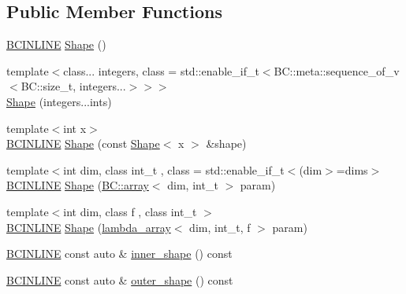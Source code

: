 \subsection*{Public Member Functions}
\begin{DoxyCompactItemize}
\item 
\hyperlink{BlackCat__Common_8h_a6699e8b0449da5c0fafb878e59c1d4b1}{B\+C\+I\+N\+L\+I\+NE} \hyperlink{classBC_1_1tensors_1_1exprs_1_1Shape_a9d196142290733eb76b4d7abb79fb5af}{Shape} ()
\item 
{\footnotesize template$<$class... integers, class  = std\+::enable\+\_\+if\+\_\+t$<$\+B\+C\+::meta\+::sequence\+\_\+of\+\_\+v$<$\+B\+C\+::size\+\_\+t, integers...$>$$>$$>$ }\\\hyperlink{classBC_1_1tensors_1_1exprs_1_1Shape_a9ba3205dd977b91533c22664066ede8d}{Shape} (integers...\+ints)
\item 
{\footnotesize template$<$int x$>$ }\\\hyperlink{BlackCat__Common_8h_a6699e8b0449da5c0fafb878e59c1d4b1}{B\+C\+I\+N\+L\+I\+NE} \hyperlink{classBC_1_1tensors_1_1exprs_1_1Shape_a12fd8a59192e94518fceab9f69308116}{Shape} (const \hyperlink{classBC_1_1tensors_1_1exprs_1_1Shape}{Shape}$<$ x $>$ \&shape)
\item 
{\footnotesize template$<$int dim, class int\+\_\+t , class  = std\+::enable\+\_\+if\+\_\+t$<$(dim$>$=dims$>$ }\\\hyperlink{BlackCat__Common_8h_a6699e8b0449da5c0fafb878e59c1d4b1}{B\+C\+I\+N\+L\+I\+NE} \hyperlink{classBC_1_1tensors_1_1exprs_1_1Shape_a990ab30cefaf5fe18ae219b7342308c8}{Shape} (\hyperlink{structBC_1_1array}{B\+C\+::array}$<$ dim, int\+\_\+t $>$ param)
\item 
{\footnotesize template$<$int dim, class f , class int\+\_\+t $>$ }\\\hyperlink{BlackCat__Common_8h_a6699e8b0449da5c0fafb878e59c1d4b1}{B\+C\+I\+N\+L\+I\+NE} \hyperlink{classBC_1_1tensors_1_1exprs_1_1Shape_a1b997075258a53d7a89db2ab9b491f12}{Shape} (\hyperlink{structBC_1_1lambda__array}{lambda\+\_\+array}$<$ dim, int\+\_\+t, f $>$ param)
\item 
\hyperlink{BlackCat__Common_8h_a6699e8b0449da5c0fafb878e59c1d4b1}{B\+C\+I\+N\+L\+I\+NE} const auto \& \hyperlink{classBC_1_1tensors_1_1exprs_1_1Shape_ae1859cd3f67fc3927d7e9673149ded06}{inner\+\_\+shape} () const 
\item 
\hyperlink{BlackCat__Common_8h_a6699e8b0449da5c0fafb878e59c1d4b1}{B\+C\+I\+N\+L\+I\+NE} const auto \& \hyperlink{classBC_1_1tensors_1_1exprs_1_1Shape_a61a5496883dab4829b324330687ea4ed}{outer\+\_\+shape} () const 

\end{DoxyCompactItemize}
